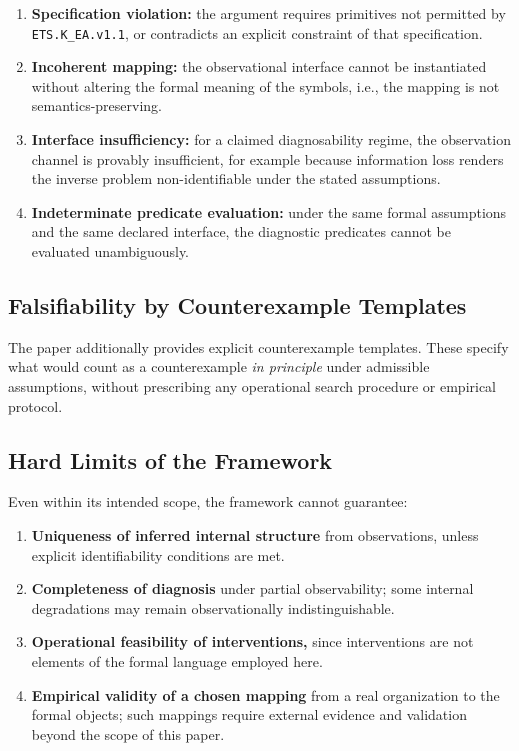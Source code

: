 \begin{enumerate}
  \item \textbf{Specification violation:}
  the argument requires primitives not permitted by \texttt{ETS.K\_EA.v1.1}, or
  contradicts an explicit constraint of that specification.

  \item \textbf{Incoherent mapping:}
  the observational interface cannot be instantiated without altering the
  formal meaning of the symbols, i.e., the mapping is not semantics-preserving.

  \item \textbf{Interface insufficiency:}
  for a claimed diagnosability regime, the observation channel is provably
  insufficient, for example because information loss renders the inverse problem
  non-identifiable under the stated assumptions.

  \item \textbf{Indeterminate predicate evaluation:}
  under the same formal assumptions and the same declared interface, the
  diagnostic predicates cannot be evaluated unambiguously.
\end{enumerate}

\subsection{Falsifiability by Counterexample Templates}
\label{subsec:falsifiability-templates-wrapper}

The paper additionally provides explicit counterexample templates.
These specify what would count as a counterexample \emph{in principle} under
admissible assumptions, without prescribing any operational search procedure or
empirical protocol.



\subsection{Hard Limits of the Framework}
\label{subsec:hard-limits}

Even within its intended scope, the framework cannot guarantee:

\begin{enumerate}
  \item \textbf{Uniqueness of inferred internal structure} from observations,
  unless explicit identifiability conditions are met.

  \item \textbf{Completeness of diagnosis} under partial observability; some
  internal degradations may remain observationally indistinguishable.

  \item \textbf{Operational feasibility of interventions,}
  since interventions are not elements of the formal language employed here.

  \item \textbf{Empirical validity of a chosen mapping}
  from a real organization to the formal objects; such mappings require external
  evidence and validation beyond the scope of this paper.
\end{enumerate}

